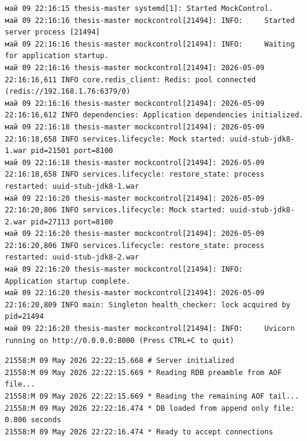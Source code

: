 \clearpage
\begin{listing}[H]
\caption{Сценарий~2. Журнал службы: обнаружение завершённых процессов и автоматический перезапуск заглушек в ходе restore\_state}
\label{lst:restore-restart-log}
\begin{mdframed}
\begin{verbatim}
май 09 22:16:15 thesis-master systemd[1]: Started MockControl.
май 09 22:16:16 thesis-master mockcontrol[21494]: INFO:     Started server process [21494]
май 09 22:16:16 thesis-master mockcontrol[21494]: INFO:     Waiting for application startup.
май 09 22:16:16 thesis-master mockcontrol[21494]: 2026-05-09 22:16:16,611 INFO core.redis_client: Redis: pool connected (redis://192.168.1.76:6379/0)
май 09 22:16:16 thesis-master mockcontrol[21494]: 2026-05-09 22:16:16,612 INFO dependencies: Application dependencies initialized.
май 09 22:16:18 thesis-master mockcontrol[21494]: 2026-05-09 22:16:18,658 INFO services.lifecycle: Mock started: uuid-stub-jdk8-1.war pid=21501 port=8100
май 09 22:16:18 thesis-master mockcontrol[21494]: 2026-05-09 22:16:18,658 INFO services.lifecycle: restore_state: process restarted: uuid-stub-jdk8-1.war
май 09 22:16:20 thesis-master mockcontrol[21494]: 2026-05-09 22:16:20,806 INFO services.lifecycle: Mock started: uuid-stub-jdk8-2.war pid=27113 port=8100
май 09 22:16:20 thesis-master mockcontrol[21494]: 2026-05-09 22:16:20,806 INFO services.lifecycle: restore_state: process restarted: uuid-stub-jdk8-2.war
май 09 22:16:20 thesis-master mockcontrol[21494]: INFO:     Application startup complete.
май 09 22:16:20 thesis-master mockcontrol[21494]: 2026-05-09 22:16:20,809 INFO main: Singleton health_checker: lock acquired by pid=21494
май 09 22:16:20 thesis-master mockcontrol[21494]: INFO:     Uvicorn running on http://0.0.0.0:8000 (Press CTRL+C to quit)
\end{verbatim}
\end{mdframed}
\end{listing}

\clearpage
\begin{listing}[H]
\caption{Сценарий~3. Журнал файла /var/log/redis/redis-server.log, подтверждающий старт из AOF после аварийного завершения}
\label{lst:redis-aof-restore-log}
\begin{mdframed}
\begin{verbatim}
21558:M 09 May 2026 22:22:15.668 # Server initialized
21558:M 09 May 2026 22:22:15.669 * Reading RDB preamble from AOF file...
21558:M 09 May 2026 22:22:15.669 * Reading the remaining AOF tail...
21558:M 09 May 2026 22:22:16.474 * DB loaded from append only file: 0.806 seconds
21558:M 09 May 2026 22:22:16.474 * Ready to accept connections
\end{verbatim}
\end{mdframed}
\end{listing}


